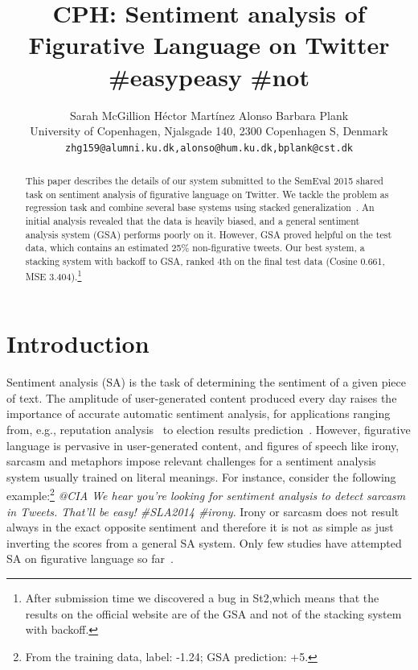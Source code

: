 \documentclass[11pt,letterpaper]{article}
\title{CPH: Sentiment analysis of Figurative Language on Twitter \#easypeasy \#not}
\author{Sarah McGillion \quad  H\'{e}ctor Mart\'{i}nez Alonso \quad Barbara Plank\\
   University of Copenhagen, Njalsgade 140, 2300 Copenhagen S, Denmark \\
  {\tt zhg159@alumni.ku.dk,alonso@hum.ku.dk,bplank@cst.dk}}
\date{}
\begin{document}
\maketitle
\begin{abstract}
 This paper describes the details of our system submitted to the SemEval 2015 shared task on sentiment analysis of figurative language on Twitter. We tackle the problem as regression task and combine several base systems using stacked generalization~\cite{Wolpert:1992}. An initial analysis revealed that the data is heavily biased, and a general sentiment analysis system (GSA) performs poorly on it. However, GSA proved helpful on the test data, which contains an estimated 25\% non-figurative tweets. Our best system, a stacking system with backoff to GSA, ranked 4th on the final test data (Cosine 0.661, MSE 3.404).\footnote{After submission time we discovered a bug in {\sc St2},which means that the results on the official website are of the GSA and not of the stacking system with backoff.}
 
\end{abstract}

\section{Introduction}
Sentiment analysis (SA) is the task of determining the sentiment of a given piece of text.
 The amplitude of user-generated content produced every day raises the importance of accurate automatic sentiment analysis, for applications ranging from, e.g., reputation analysis~\cite{amigo2013overview} to election results prediction~\cite{sang2012predicting}. However, figurative language is pervasive in user-generated content, and figures of speech like irony, sarcasm and metaphors impose relevant challenges for a sentiment analysis system usually trained on literal meanings.
For instance, consider the following example:\footnote{From the training data, label: -1.24; GSA prediction: +5.} {\em @CIA We hear you're looking for sentiment analysis to detect sarcasm in Tweets. That'll be easy! \#SLA2014 \#irony}. %
 Irony or sarcasm does not result always in the exact opposite sentiment and therefore it is not as simple as just inverting the scores from a general SA system.
Only few studies have attempted SA on figurative language so far~\cite{reyes2012making,reyes2013multidimensional}.
\end{document}
